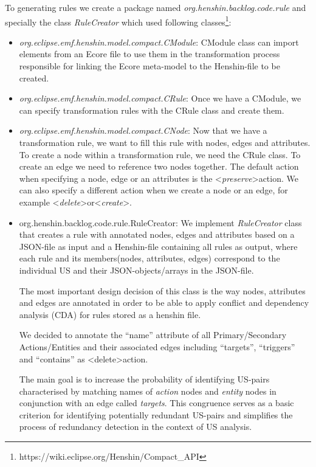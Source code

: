 To generating rules we create a package named \textit{org.henshin.backlog.code.rule} and specially the class \textit{RuleCreator} which used following classes\footnote{https://wiki.eclipse.org/Henshin/Compact\_API}\label{compact_api}:
\begin{itemize}
\item \textit{org.eclipse.emf.henshin.model.compact.CModule}: CModule class can import elements from an Ecore file to use them in the transformation process responsible for linking the Ecore meta-model to the Henshin-file to be created.
\item \textit{org.eclipse.emf.henshin.model.compact.CRule}: Once we have a CModule, we can specify transformation rules with the CRule class and create them.
\item \textit{org.eclipse.emf.henshin.model.compact.CNode}: Now that we have a transformation rule, we want to fill this rule with nodes, edges and attributes. To create a node within a transformation rule, we need the CRule class. To create an edge we need to reference two nodes together. The default action when specifying a node, edge or an attributes is the \textless\emph{preserve}\textgreater action. We can also specify a different action when we create a node or an edge, for example \textless\emph{delete}\textgreater or\textless\emph{create}\textgreater.
\item org.henshin.backlog.code.rule.RuleCreator: We implement \textit{RuleCreator} class that creates a rule with annotated nodes, edges and attributes based on a JSON-file as input and a Henshin-file containing all rules as output, where each rule and its members(nodes, attributes, edges) correspond to the individual US and their JSON-objects/arrays in the JSON-file. 

The most important design decision of this class is the way nodes, attributes and edges are annotated in order to be able to apply conflict and dependency analysis (CDA) for rules stored as a henshin file.

We decided to annotate the \enquote{name} attribute of all Primary/Secondary Actions/Entities and their associated edges including \enquote{targets}, \enquote{triggers} and \enquote{contains} as \textless delete\textgreater action. 

The main goal is to increase the probability of identifying US-pairs characterised by matching names of \textit{action} nodes and \textit{entity} nodes in conjunction with an edge called \textit{targets}. This congruence serves as a basic criterion for identifying potentially redundant US-pairs and simplifies the process of redundancy detection in the context of US analysis.
\end{itemize}
